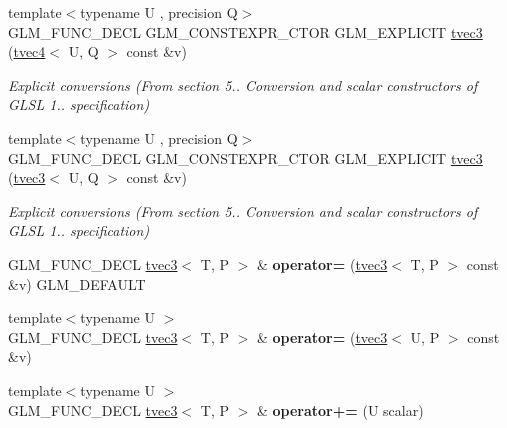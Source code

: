 \begin{DoxyCompactItemize}
{\footnotesize template$<$typename U , precision Q$>$ }\\G\+L\+M\+\_\+\+F\+U\+N\+C\+\_\+\+D\+E\+CL G\+L\+M\+\_\+\+C\+O\+N\+S\+T\+E\+X\+P\+R\+\_\+\+C\+T\+OR G\+L\+M\+\_\+\+E\+X\+P\+L\+I\+C\+IT \hyperlink{structglm_1_1tvec3_a63301c5a33a1fd31f0046f8c24eb6184}{tvec3} (\hyperlink{structglm_1_1tvec4}{tvec4}$<$ U, Q $>$ const \&v)
\begin{DoxyCompactList}\small\item\em Explicit conversions (From section 5.. Conversion and scalar constructors of G\+L\+SL 1.. specification) \end{DoxyCompactList}\item 
\mbox{\label{structglm_1_1tvec3_a8e402385548b575f903d25fbefede459}} 
{\footnotesize template$<$typename U , precision Q$>$ }\\G\+L\+M\+\_\+\+F\+U\+N\+C\+\_\+\+D\+E\+CL G\+L\+M\+\_\+\+C\+O\+N\+S\+T\+E\+X\+P\+R\+\_\+\+C\+T\+OR G\+L\+M\+\_\+\+E\+X\+P\+L\+I\+C\+IT \hyperlink{structglm_1_1tvec3_a8e402385548b575f903d25fbefede459}{tvec3} (\hyperlink{structglm_1_1tvec3}{tvec3}$<$ U, Q $>$ const \&v)
\begin{DoxyCompactList}\small\item\em Explicit conversions (From section 5.. Conversion and scalar constructors of G\+L\+SL 1.. specification) \end{DoxyCompactList}\item 
\mbox{\label{structglm_1_1tvec3_ad790b1fabd3d2c5e77324f6812be2e1b}} 
G\+L\+M\+\_\+\+F\+U\+N\+C\+\_\+\+D\+E\+CL \hyperlink{structglm_1_1tvec3}{tvec3}$<$ T, P $>$ \& {\bfseries operator=} (\hyperlink{structglm_1_1tvec3}{tvec3}$<$ T, P $>$ const \&v) G\+L\+M\+\_\+\+D\+E\+F\+A\+U\+LT
\item 
\mbox{\label{structglm_1_1tvec3_aff4967c521c4bc8f009eed5db29c9406}} 
{\footnotesize template$<$typename U $>$ }\\G\+L\+M\+\_\+\+F\+U\+N\+C\+\_\+\+D\+E\+CL \hyperlink{structglm_1_1tvec3}{tvec3}$<$ T, P $>$ \& {\bfseries operator=} (\hyperlink{structglm_1_1tvec3}{tvec3}$<$ U, P $>$ const \&v)
\item 
\mbox{\label{structglm_1_1tvec3_af22cc44c2405f4db35bc67994a5b0c50}} 
{\footnotesize template$<$typename U $>$ }\\G\+L\+M\+\_\+\+F\+U\+N\+C\+\_\+\+D\+E\+CL \hyperlink{structglm_1_1tvec3}{tvec3}$<$ T, P $>$ \& {\bfseries operator+=} (U scalar)

\end{DoxyCompactItemize}
